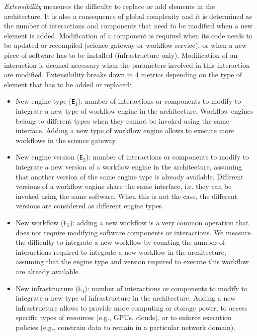 \documentclass[preprint,3p,twocolumn]{elsarticle}
\newcommand{\todo}[2]{\pdfmargincomment[color=red,author=#1,open=true]{#2}}
\begin{document}
\emph{Extensibility} measures the difficulty to replace or add
elements in the architecture. It is also a consequence of global
complexity and it is determined as the number of interactions and
components that need to be modified when a new element is
added. Modification of a component is required when its code needs to
be updated or recompiled (science gateway or workflow service), or
when a new piece of software has to be installed (infrastructure
only). Modification of an interaction is deemed necessary when the
parameters involved in this interaction are modified.  Extensibility
breaks down in 4 metrics depending on the type of element that has to
be added or replaced:
\begin{itemize}[leftmargin=0cm,itemindent=0.35cm,itemsep=0cm]
\item New engine type (\texttt{E$_1$}): number of interactions or
  components to modify to integrate a new type of workflow engine in
  the architecture. Workflow engines belong to different types when
  they cannot be invoked using the same interface. Adding a new type
  of workflow engine allows to execute more workflows in the science
  gateway.
\item New engine version (\texttt{E$_2$}): number of interactions or
  components to modify to integrate a new version of a workflow engine
  in the architecture, assuming that another version of the same
  engine type is already available. Different versions of a workflow
  engine share the same interface, i.e. they can be invoked using the
  same software. When this is not the case, the different versions are
  considered as different engine types.
\item New workflow (\texttt{E$_3$}): adding a new workflow is a very
  common operation that does not require modifying software components
  or interactions. We measure the difficulty to integrate a new
  workflow by counting the number of interactions required
  to integrate a new workflow in the architecture, assuming
  that the engine type and version required to execute this workflow
  are already available.
\item New infrastructure (\texttt{E$_4$}): number of interactions or
  components to modify to integrate a new type of infrastructure in
  the architecture. Adding a new infrastructure allows to provide more
  computing or storage power, to access specific types of resources
  (e.g., GPUs, clouds), or to enforce execution policies (e.g.,
  constrain data to remain in a particular network domain). 
\end{itemize}
\end{document}
